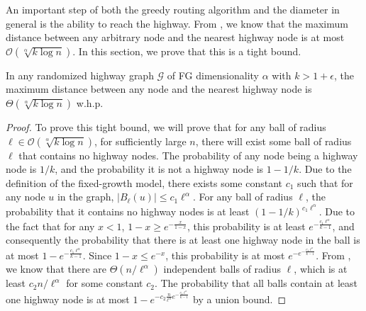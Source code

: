 An important step of both the greedy routing algorithm and the diameter in
general is the ability to reach the highway.
From , we know that the maximum distance
between any arbitrary node and the nearest highway node is at most
$\mathcal{O}(\sqrt[\alpha]{k \log{n}})$.
In this section, we prove that this is a tight bound.
%
\begin{lemma} \label{lem:distance-to-highway}
    In any randomized highway graph $\mathcal{G}$ of FG dimensionality $\alpha$ with $k > 1 + \epsilon$, the maximum
    distance between any node and the nearest highway node is
    $\Theta(\sqrt[\alpha]{k \log{n}})$ w.h.p.
\end{lemma}
%
\begin{proof}
    To prove this tight bound, we will prove that for any ball of radius $\ell \in
    \mathcal{O}(\sqrt[\alpha]{k \log{n}})$, for sufficiently large $n$, there will exist
    some ball of radius $\ell$ that contains no highway nodes.
    The probability of any node being a highway node is $1/k$, and the
    probability it is not a highway node is $1 - 1/k$.
    Due to the definition of the fixed-growth model, there exists some constant
    $c_1$ such that for any node $u$ in the graph, $|B_\ell(u)| \leq c_1
    \ell^\alpha$.
    For any ball of radius $\ell$, the probability that it contains no highway
    nodes is at least $(1 - 1/k)^{c_1 \ell^\alpha}$.
    Due to the fact that for any $x < 1$, $1 - x \geq e^{-\frac{x}{1 - x}}$,
    this probability is at least $e^{-\frac{c_1 \ell^\alpha}{k - 1}}$, and
    consequently the probability that there is at least one highway node in the
    ball is at most $1 - e^{-\frac{c_1 \ell^\alpha}{k - 1}}$.
    Since $1 - x \leq e^{-x}$, this probability is at most $e^{-e^{-\frac{c_1
    \ell^\alpha}{k - 1}}}$.
    From , we know that there are $\Theta(n /
    \ell^\alpha)$ independent balls of radius $\ell$, which is at least $c_2 n /
    \ell^\alpha$ for some constant $c_2$.
    The probability that all balls contain at least one highway node is
    at most $1 - e^{-c_2 \frac{n}{\ell^\alpha} e^{-\frac{c_1
    \ell^\alpha}{k - 1}}}$ by a union bound.


\end{proof}
